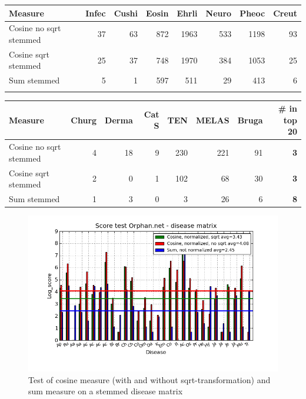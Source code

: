 \begin{table}[H]
  \begin{tiny}
    \label{testResult_diseaseMatrix_bmj_hist_norm_3000_s_cos_sqrt_cos_sum_nn}
    \begin{tabular}{|l|r|r|r|r|r|r|r|}
      \hline
      Measure &Infec&Cushi&Eosin&Ehrli&Neuro&Pheoc&Creut \\
      \hline
      Cosine no sqrt stemmed &37&63&872&1963&533&1198&93 \\
      \hline
      Cosine sqrt stemmed &25&37&748&1970&384&1053&25 \\
      \hline
      Sum stemmed &5&1&597&511&29&413&6 \\
      \hline
      \multicolumn{8}{c}{} \\
    \end{tabular}
    \begin{tabular}{|l|r|r|r|r|r|r|r|}
      \hline
      Measure &Churg&Derma&Cat S&TEN&MELAS&Bruga& \scriptsize{\textbf{\# in top 20}} \\
      \hline
      Cosine no sqrt stemmed &4&18&9&230&221&91 &\scriptsize{\textbf{3}} \\
      \hline
      Cosine sqrt stemmed &2&0&1&102&68&30 &  \scriptsize{\textbf{3}}\\
      \hline
      Sum stemmed &1&3&0&3&26&6 & \scriptsize{\textbf{8}} \\
      \hline
    \end{tabular}
  \end{tiny}
\end{table}

\begin{figure}[H]
  \caption{Test of cosine measure (with and without sqrt-transformation) and sum measure on a stemmed disease matrix}
  \begin{center}
    \includegraphics[width=1.2\textwidth]{barcharts/diseaseMatrix_orphan_hist_NOTnorm_3000_s_cos_sqrt_cos_sum_nn.png}
  \end{center}
  \label{diseaseMatrix_orphan_hist_NOTnorm_3000_s_cos_sqrt_cos_sum_nn}
\end{figure}

